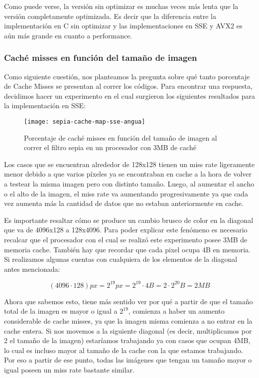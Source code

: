 Como puede verse, la versión sin optimizar es muchas veces más lenta que la versión completamente optimizada. Es decir que la diferencia entre la implementación en C sin optimizar y las implementaciones en SSE y AVX2 es aún más grande en cuanto a performance.

\subsubsection{Caché misses en función del tamaño de imagen}

Como siguiente cuestión, nos planteamos la pregunta sobre qué tanto porcentaje de Cache Misses se presentan al correr los códigos. Para encontrar una respuesta, decidimos hacer un experimento en el cual surgieron los siguientes resultados para la implementación en SSE:

\begin{figure}[h]
    \centering
    \texttt{[image: sepia-cache-map-sse-angua]}
    \caption{Porcentaje de caché misses en función del tamaño de imagen al correr el filtro sepia en un procesador con 3MB de caché}
    \label{fig:sepia-cache-map-sse-angua}
\end{figure}

Los casos que se encuentran alrededor de 128x128 tienen un miss rate ligeramente menor debido a que varios píxeles ya se encontraban en cache a la hora de volver a testear la misma imagen pero con distinto tamaño. Luego, al aumentar el ancho o el alto de la imagen, el miss rate va aumentando progresivamente ya que cada vez aumenta más la cantidad de datos que no estaban anteriormente en cache.

Es importante resaltar cómo se produce un cambio brusco de color en la diagonal que va de 4096x128 a 128x4096. Para poder explicar este fenómeno es necesario recalcar que el procesador con el cual se realizó este experimento posee 3MB de memoria cache. También hay que recordar que cada pixel ocupa 4B en memoria. Si realizamos algunas cuentas con cualquiera de los elementos de la diagonal antes mencionada:

$$(4096 \cdot 128) px = 2^{19} px = 2^{19} \cdot 4 B = 2 \cdot 2^{20} B = 2MB$$

Ahora que sabemos esto, tiene más sentido ver por qué a partir de que el tamaño total de la imagen es mayor o igual a $2^{19}$, comienza a haber un aumento considerable de cache misses, ya que la imagen misma comienza a no entrar en la cache entera. Si nos movemos a la siguiente diagonal (es decir, multiplicamos por 2 el tamaño de la imagen) estaríamos trabajando ya con casos que ocupan 4MB, lo cual es incluso mayor al tamaño de la cache con la que estamos trabajando. Por eso a partir de ese punto, todas las imágenes que tengan un tamaño mayor o igual poseen un miss rate bastante similar.

